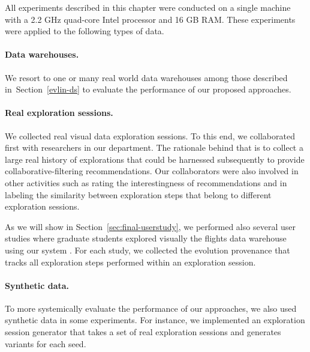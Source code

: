 All experiments described in this chapter were conducted on a single machine with a 2.2 GHz quad-core Intel processor and 16 GB RAM.
These experiments were applied to the following types of data.

\paragraph*{\textbf{Data warehouses.}}
We resort to one or many real world data warehouses among those described in~Section~\ref{evlin-ds} to evaluate the performance of our proposed approaches.


\paragraph*{\textbf{Real exploration sessions.}}
We collected real visual data exploration sessions. To this end, we collaborated first with researchers in our department. The rationale behind that is to collect a large real history of explorations that could be harnessed subsequently to provide collaborative-filtering recommendations.
 Our collaborators were also involved in other activities such as rating the interestingness of recommendations and in labeling the similarity between exploration steps that belong to different exploration sessions.

As we will show in Section~\ref{sec:final-userstudy}, we performed also several user studies where graduate students explored visually the flights data warehouse using our system \prototype{}.
For each study, we collected the evolution provenance that tracks all exploration steps performed within an exploration session. 



\paragraph*{\textbf{Synthetic data.}}
To more systemically evaluate the performance of our approaches, we also used synthetic data in some experiments.  For instance, we implemented an exploration session generator that takes a set of real exploration sessions and generates variants for each seed. 


